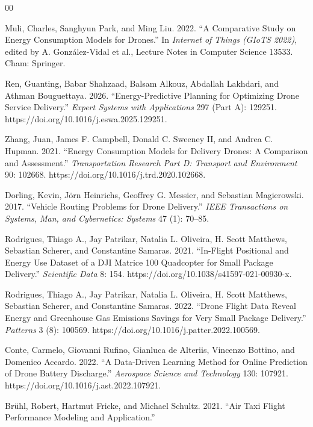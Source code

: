 \documentclass[conference, letter]{IEEEtran}
\begin{document}
\begin{thebibliography}{00}

Muli, Charles, Sanghyun Park, and Ming Liu. 2022.
“A Comparative Study on Energy Consumption Models for Drones.”
In \textit{Internet of Things (GIoTS 2022)},
edited by A. González-Vidal et al.,
Lecture Notes in Computer Science 13533.
Cham: Springer.

Ren, Guanting, Babar Shahzaad, Balsam Alkouz, Abdallah Lakhdari, and Athman Bouguettaya. 2026.
“Energy-Predictive Planning for Optimizing Drone Service Delivery.”
\textit{Expert Systems with Applications} 297 (Part A): 129251.
https://doi.org/10.1016/j.eswa.2025.129251.

Zhang, Juan, James F. Campbell, Donald C. Sweeney II, and Andrea C. Hupman. 2021.
“Energy Consumption Models for Delivery Drones: A Comparison and Assessment.”
\textit{Transportation Research Part D: Transport and Environment} 90: 102668.
https://doi.org/10.1016/j.trd.2020.102668.

Dorling, Kevin, Jörn Heinrichs, Geoffrey G. Messier, and Sebastian Magierowski. 2017.
“Vehicle Routing Problems for Drone Delivery.”
\textit{IEEE Transactions on Systems, Man, and Cybernetics: Systems} 47 (1): 70–85.

Rodrigues, Thiago A., Jay Patrikar, Natalia L. Oliveira, H. Scott Matthews, Sebastian Scherer, and Constantine Samaras. 2021.
“In-Flight Positional and Energy Use Dataset of a DJI Matrice 100 Quadcopter for Small Package Delivery.”
\textit{Scientific Data} 8: 154.
https://doi.org/10.1038/s41597-021-00930-x.

Rodrigues, Thiago A., Jay Patrikar, Natalia L. Oliveira, H. Scott Matthews, Sebastian Scherer, and Constantine Samaras. 2022.
“Drone Flight Data Reveal Energy and Greenhouse Gas Emissions Savings for Very Small Package Delivery.”
\textit{Patterns} 3 (8): 100569.
https://doi.org/10.1016/j.patter.2022.100569.

Conte, Carmelo, Giovanni Rufino, Gianluca de Alteriis, Vincenzo Bottino, and Domenico Accardo. 2022.
“A Data-Driven Learning Method for Online Prediction of Drone Battery Discharge.”
\textit{Aerospace Science and Technology} 130: 107921.
https://doi.org/10.1016/j.ast.2022.107921.

Brühl, Robert, Hartmut Fricke, and Michael Schultz. 2021.
“Air Taxi Flight Performance Modeling and Application.”


\end{thebibliography}
\end{document}
